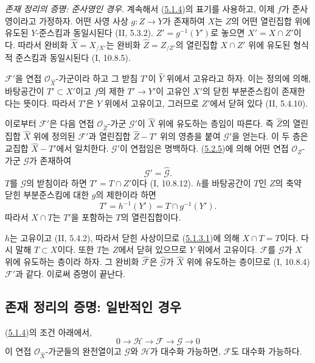 \begin{env}[5.2.6]
\label{III.5.2.6-fr}
\emph{존재 정리의 증명: 준사영인 경우.}
계속해서 (\hyperref[III.5.1.4-fr]{5.1.4})의 표기를 사용하고,
이제 $f$가 준사영이라고 가정하자. 어떤 사영 사상
$g:Z\to Y$가 존재하여 $X$는 $Z$의 어떤 열린집합 위에 유도된
$Y$-준스킴과 동일시된다 (II, 5.3.2).
$Z'=g^{-1}(Y')$로 놓으면 $X'=X\cap Z'$이다. 따라서 완비화
$\widehat X=X_{/X'}$는 완비화
$\widehat Z=Z_{/Z'}$의 열린집합 $X\cap Z'$ 위에 유도된 형식적
준스킴과 동일시된다 (I, 10.8.5).

$\mathcal F'$을 연접 $\mathcal O_{\widehat X}$-가군이라 하고 그
받침 $T'$이 $\widehat Y$ 위에서 고유라고 하자. 이는 정의에 의해,
바탕공간이 $T'\subset X'$이고 $f$의 제한 $T'\to Y'$이 고유인
$X'$의 닫힌 부분준스킴이 존재한다는 뜻이다. 따라서 $T'$은
$Y$ 위에서 고유이고, 그러므로 $Z'$에서 닫혀 있다
(II, 5.4.10).

이로부터 $\mathcal F'$은 다음 연접
$\mathcal O_{\widehat Z}$-가군 $\mathcal G'$이
$\widehat X$ 위에 유도하는 층임이 따른다. 즉
$\widehat Z$의 열린집합 $\widehat X$ 위에 정의된
$\mathcal F'$과 열린집합 $\widehat Z-T'$ 위의 영층을 붙여
$\mathcal G'$을 얻는다. 이 두 층은 교집합
$\widehat X-T'$에서 일치한다. $\mathcal G'$이 연접임은
명백하다. (\hyperref[III.5.2.5-fr]{5.2.5})에 의해 어떤 연접
$\mathcal O_Z$-가군 $\mathcal G$가 존재하여
\[
\mathcal G'=\widehat{\mathcal G}.
\]
$T$를 $\mathcal G$의 받침이라 하면
$T'=T\cap Z'$이다 (I, 10.8.12). $h$를 바탕공간이 $T$인 $Z$의
축약 닫힌 부분준스킴에 대한 $g$의 제한이라 하면
\[
T'=h^{-1}(Y')=T\cap g^{-1}(Y').
\]
따라서 $X\cap T$는 $T'$을 포함하는 $T$의 열린집합이다.


$h$는 고유이고 (II, 5.4.2), 따라서 닫힌 사상이므로
(\hyperref[III.5.1.3.1-fr]{5.1.3.1})에 의해
$X\cap T=T$이다. 다시 말해 $T\subset X$이다. 또한 $T$는
$Z$에서 닫혀 있으므로 $Y$ 위에서 고유이다.
$\mathcal F$를 $\mathcal G$가 $X$ 위에 유도하는 층이라 하자.
그 완비화 $\widehat{\mathcal F}$은
$\widehat{\mathcal G}$가 $\widehat X$ 위에 유도하는 층이므로
(I, 10.8.4) $\mathcal F'$과 같다. 이로써 증명이 끝난다.
\end{env}

\subsection{존재 정리의 증명: 일반적인 경우}
\label{subsection:III.5.3-fr}

\begin{lemma}[5.3.1]
\label{III.5.3.1-fr}
(\hyperref[III.5.1.4-fr]{5.1.4})의 조건 아래에서,
\[
0\to\mathcal H\to\mathcal F\to\mathcal G\to0
\]
이 연접 $\mathcal O_{\widehat X}$-가군들의 완전열이고
$\mathcal G$와 $\mathcal H$가 대수화 가능하면, $\mathcal F$도
대수화 가능하다.
\end{lemma}

